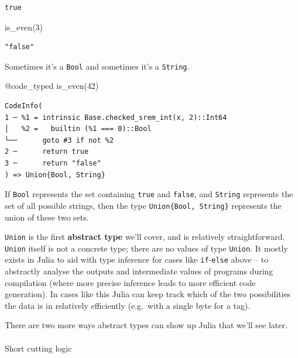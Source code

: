 \documentclass[
]{article}
\makeatletter
\let\oldparagraph\paragraph
\renewcommand{\paragraph}{
    \@ifstar
      \xxxParagraphStar
      \xxxParagraphNoStar
  }
\newcommand{\xxxParagraphStar}[1]{\oldparagraph*{#1}\mbox{}}
\newcommand{\xxxParagraphNoStar}[1]{\oldparagraph{#1}\mbox{}}
\newenvironment{Shaded}{\begin{snugshade}}{\end{snugshade}}
\newcommand{\FloatTok}[1]{\textcolor[rgb]{0.68,0.00,0.00}{#1}}
\newcommand{\FunctionTok}[1]{\textcolor[rgb]{0.28,0.35,0.67}{#1}}
\newcommand{\NormalTok}[1]{\textcolor[rgb]{0.00,0.23,0.31}{#1}}
\newcommand{\PreprocessorTok}[1]{\textcolor[rgb]{0.68,0.00,0.00}{#1}}
\makeatother
\begin{document}
\begin{verbatim}
true
\end{verbatim}

\begin{Shaded}
\begin{Highlighting}[]
\FunctionTok{is\_even}\NormalTok{(}\FloatTok{3}\NormalTok{)}
\end{Highlighting}
\end{Shaded}

\begin{verbatim}
"false"
\end{verbatim}

Sometimes it's a \texttt{Bool} and sometimes it's a \texttt{String}.

\begin{Shaded}
\begin{Highlighting}[]
\PreprocessorTok{@code\_typed} \FunctionTok{is\_even}\NormalTok{(}\FloatTok{42}\NormalTok{)}
\end{Highlighting}
\end{Shaded}

\begin{verbatim}
CodeInfo(
1 ─ %1 = intrinsic Base.checked_srem_int(x, 2)::Int64
│   %2 =   builtin (%1 === 0)::Bool
└──      goto #3 if not %2
2 ─      return true
3 ─      return "false"
) => Union{Bool, String}
\end{verbatim}

If \texttt{Bool} represents the set containing \texttt{true} and
\texttt{false}, and \texttt{String} represents the set of all possible
strings, then the type \texttt{Union\{Bool,\ String\}} represents the
union of these two sets.

\texttt{Union} is the first \textbf{abstract type} we'll cover, and is
relatively straightforward. \texttt{Union} itself is not a concrete
type; there are no values of type \texttt{Union}. It mostly exists in
Julia to aid with type inference for cases like
\texttt{if}-\texttt{else} above -- to abstractly analyse the outputs and
intermediate values of programs during compilation (where more precise
inference leads to more efficient code generation). In cases like this
Julia can keep track which of the two possibilities the data is in
relatively efficiently (e.g.~with a single byte for a tag).

There are two more ways abstract types can show up Julia that we'll see
later.

\paragraph{Short cutting logic}\label{short-cutting-logic}
\end{document}
